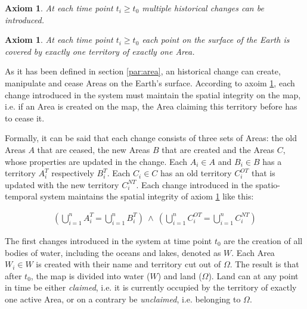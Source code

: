 \vspace{-2.0em}
\newtheorem{historical_change}[assicounter]{Axiom}
\begin{historical_change}
\label{axm:historical_change}
  At each time point $t_i \geq t_0$ multiple historical changes can be introduced.
\end{historical_change}

\vspace{-2.0em}
\newtheorem{unique_coverage}[assicounter]{Axiom}
\begin{unique_coverage}
\label{axm:unique_coverage}
  At each time point $t_i \geq t_0$ each point on the surface of the Earth is covered by exactly one territory of exactly one Area.
\end{unique_coverage}

As it has been defined in section \ref{par:area}, an historical change can create, manipulate and cease Areas on the Earth's surface. According to axoim \ref{axm:unique_coverage}, each change introduced in the system must maintain the spatial integrity on the map, i.e. if an Area is created on the map, the Area claiming this territory before has to cease it.

Formally, it can be said that each change consists of three sets of Areas: the old Areas $A$ that are ceased, the new Areas $B$ that are created and the Areas $C$, whose properties are updated in the change. Each $A_i \in A$ and $B_i \in B$ has a territory $A_i^T$ respectively $B_i^T$. Each $C_i \in C$ has an old territory $C_i^{OT}$ that is updated with the new territory $C_i^{NT}$. Each change introduced in the spatio-temporal system maintains the spatial integrity of axiom \ref{axm:unique_coverage} like this:

\vspace{-2em}
\begin{align*}
  \left(\bigcup\limits_{i=1}^n A_i^T    ~\textbf{=}~ \bigcup\limits_{i=1}^n B_i^T\right)
  ~\wedge~
  \left(\bigcup\limits_{i=1}^n C_i^{OT} ~\textbf{=}~ \bigcup\limits_{i=1}^n C_i^{NT}\right)
\end{align*}

The first changes introduced in the system at time point $t_0$ are the creation of all bodies of water, including the oceans and lakes, denoted as $W$. Each Area $W_i \in W$ is created with their name and territory cut out of $\Omega$. The result is that after $t_0$, the map is divided into water ($W$) and land ($\Omega$). Land can at any point in time be either \emph{claimed}, i.e. it is currently occupied by the territory of exactly one active Area, or on a contrary be \emph{unclaimed}, i.e. belonging to $\Omega$.

